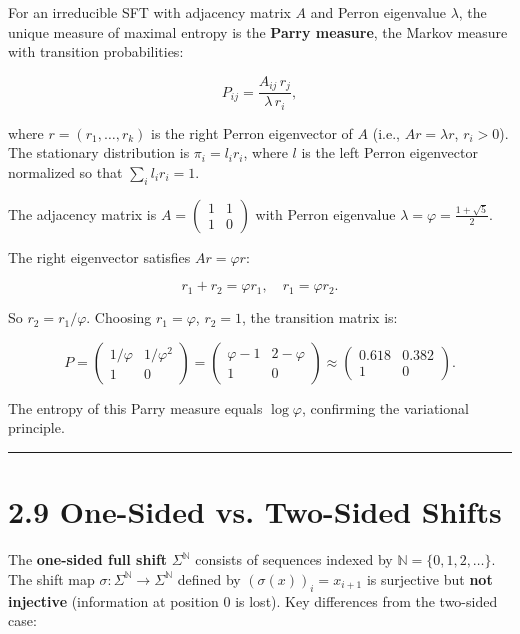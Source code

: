 \begin{theorem}[Parry, 1964]
For an irreducible SFT with adjacency matrix $A$ and Perron eigenvalue $\lambda$, the unique measure of maximal entropy is the \textbf{Parry measure}, the Markov measure with transition probabilities:

\[
P_{ij} = \frac{A_{ij} \, r_j}{\lambda \, r_i},
\]

where $r = (r_1, \ldots, r_k)$ is the right Perron eigenvector of $A$ (i.e., $Ar = \lambda r$, $r_i > 0$). The stationary distribution is $\pi_i = l_i r_i$, where $l$ is the left Perron eigenvector normalized so that $\sum_i l_i r_i = 1$.
\end{theorem}

\begin{example}
The adjacency matrix is $A = \begin{pmatrix} 1 & 1 \\ 1 & 0 \end{pmatrix}$ with Perron eigenvalue $\lambda = \varphi = \frac{1+\sqrt{5}}{2}$.

The right eigenvector satisfies $Ar = \varphi r$:

\[
r_1 + r_2 = \varphi r_1, \quad r_1 = \varphi r_2.
\]

So $r_2 = r_1 / \varphi$. Choosing $r_1 = \varphi$, $r_2 = 1$, the transition matrix is:

\[
P = \begin{pmatrix} 1/\varphi & 1/\varphi^2 \\ 1 & 0 \end{pmatrix} = \begin{pmatrix} \varphi - 1 & 2 - \varphi \\ 1 & 0 \end{pmatrix} \approx \begin{pmatrix} 0.618 & 0.382 \\ 1 & 0 \end{pmatrix}.
\]

The entropy of this Parry measure equals $\log \varphi$, confirming the variational principle.

\bigskip\hrule\bigskip
\end{example}

\section{2.9 One-Sided vs. Two-Sided Shifts}

The \textbf{one-sided full shift} $\Sigma^{\mathbb{N}}$ consists of sequences indexed by $\mathbb{N} = \{ 0, 1, 2, \ldots\} $. The shift map $\sigma : \Sigma^{\mathbb{N}} \to \Sigma^{\mathbb{N}}$ defined by $(\sigma(x))_i = x_{i+1}$ is surjective but \textbf{not injective} (information at position 0 is lost). Key differences from the two-sided case:

